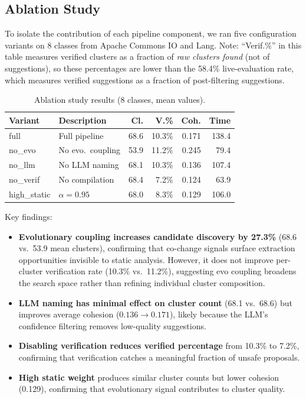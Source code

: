\documentclass[sigconf]{acmart}
\begin{document}
\subsection{Ablation Study}
\label{sec:ablation}

To isolate the contribution of each pipeline component, we ran five
configuration variants on 8 classes from Apache Commons IO and Lang.
Note: ``Verif.\%'' in this table measures verified clusters as a fraction of
\emph{raw clusters found} (not of suggestions), so these percentages are lower
than the 58.4\% live-evaluation rate, which measures verified suggestions as a
fraction of post-filtering suggestions.

\begin{table}[t]
\centering\small
\caption{Ablation study results (8 classes, mean values).}
\label{tab:ablation}
\begin{tabular}{@{}lp{2.0cm}rrrr@{}}
\toprule
\textbf{Variant} & \textbf{Description} & \textbf{Cl.} & \textbf{V.\%} & \textbf{Coh.} & \textbf{Time} \\
\midrule
full             & Full pipeline       & 68.6 & 10.3\% & 0.171 & 138.4 \\
no\_evo          & No evo.\ coupling   & 53.9 & 11.2\% & 0.245 & 79.4  \\
no\_llm          & No LLM naming       & 68.1 & 10.3\% & 0.136 & 107.4 \\
no\_verif        & No compilation      & 68.4 &  7.2\% & 0.124 &  63.9 \\
high\_static     & $\alpha{=}0.95$     & 68.0 & 8.3\% & 0.129 & 106.0 \\
\bottomrule
\end{tabular}
\end{table}

Key findings:
\begin{itemize}
  \item \textbf{Evolutionary coupling increases candidate discovery by 27.3\%}
        (68.6 vs.\ 53.9 mean clusters), confirming that co-change signals
        surface extraction opportunities invisible to static analysis. However,
        it does not improve per-cluster verification rate (10.3\% vs.\ 11.2\%),
        suggesting evo coupling broadens the search space rather than refining
        individual cluster composition.
  \item \textbf{LLM naming has minimal effect on cluster count} (68.1 vs.\
        68.6) but improves average cohesion ($0.136 \to 0.171$), likely because
        the LLM's confidence filtering removes low-quality suggestions.
  \item \textbf{Disabling verification reduces verified percentage} from 10.3\%
        to 7.2\%, confirming that verification catches a meaningful fraction of
        unsafe proposals.
  \item \textbf{High static weight} produces similar cluster counts but lower
        cohesion (0.129), confirming that evolutionary signal contributes to
        cluster quality.
\end{itemize}
\end{document}
